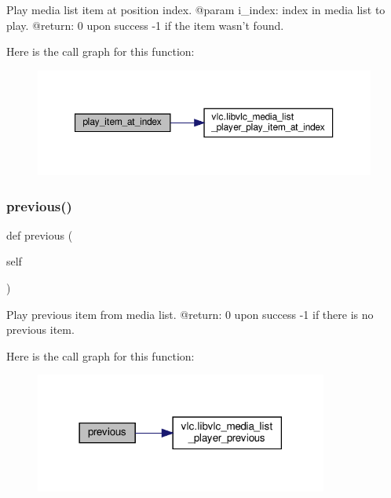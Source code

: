 \begin{DoxyVerb}Play media list item at position index.
@param i_index: index in media list to play.
@return: 0 upon success -1 if the item wasn't found.
\end{DoxyVerb}
 Here is the call graph for this function\+:
\nopagebreak
\begin{figure}[H]
\begin{center}
\leavevmode
\includegraphics[width=350pt]{classvlc_1_1_media_list_player_a3417cb00988d93c1cfa0123e93059d19_cgraph}
\end{center}
\end{figure}
\mbox{\label{classvlc_1_1_media_list_player_a14cf85a983795cd01d9825b5bad079e7}} 
\subsubsection{\texorpdfstring{previous()}{previous()}}
{\footnotesize\ttfamily def previous (\begin{DoxyParamCaption}\item[{}]{self }\end{DoxyParamCaption})}

\begin{DoxyVerb}Play previous item from media list.
@return: 0 upon success -1 if there is no previous item.
\end{DoxyVerb}
 Here is the call graph for this function\+:
\nopagebreak
\begin{figure}[H]
\begin{center}
\leavevmode
\includegraphics[width=273pt]{classvlc_1_1_media_list_player_a14cf85a983795cd01d9825b5bad079e7_cgraph}
\end{center}
\end{figure}
\mbox{\label{classvlc_1_1_media_list_player_a4cd51e19135e5ad4a19eae3ea9c60537}} 
